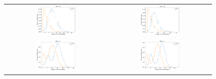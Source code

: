 \documentclass[preprintm,linenumbers]{aastex631}
\begin{document}
      \begin{figure}
			\centering
			\begin{tabular}{c c}
				\includegraphics[width=0.4\textwidth]{results/histograms/hist_first_year_one_snap_v4_0_10yrs_db_noDD_noTwi_CountMetric_doAllTemplateMetrics_reduceCount_u_14_noDD_noTwi.pdf} &
				 \includegraphics[width=0.4\textwidth]{results/histograms/hist_first_year_one_snap_v4_0_10yrs_db_noDD_noTwi_CountMetric_doAllTemplateMetrics_reduceCount_g_14_noDD_noTwi.pdf} \\
				 \includegraphics[width=0.4\textwidth]{results/histograms/hist_first_year_one_snap_v4_0_10yrs_db_noDD_noTwi_CountMetric_doAllTemplateMetrics_reduceCount_r_14_noDD_noTwi.pdf} &
				\includegraphics[width=0.4\textwidth]{results/histograms/hist_first_year_one_snap_v4_0_10yrs_db_noDD_noTwi_CountMetric_doAllTemplateMetrics_reduceCount_i_14_noDD_noTwi.pdf} \\

\end{tabular}
\end{figure}
\end{document}

